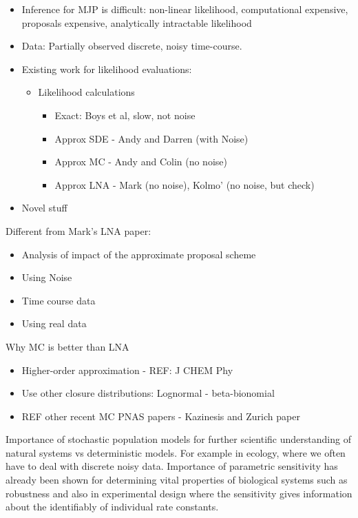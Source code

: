 \documentclass{pnastwo}
\begin{document}
\begin{article}
\begin{itemize}
\item Inference for MJP is difficult: non-linear likelihood, computational
  expensive, proposals expensive, analytically intractable likelihood
\item Data: Partially observed discrete, noisy time-course.
\item Existing work for likelihood evaluations: 
\begin{itemize}
\item Likelihood calculations
\begin{itemize}
\item Exact: Boys et al, slow, not noise
\item Approx SDE - Andy and Darren (with Noise)
\item Approx MC - Andy and Colin (no noise)
\item Approx LNA - Mark (no noise), Kolmo' (no noise, but check)
\end{itemize}
\end{itemize}
\item Novel stuff
\end{itemize}
Different from Mark's LNA paper:
\begin{itemize}
\item Analysis of impact of the approximate proposal scheme
\item Using Noise
\item Time course data
\item Using real data
\end{itemize}
Why MC is better than LNA
\begin{itemize}
\item Higher-order approximation - REF: J CHEM Phy
\item Use other closure distributions: Lognormal - beta-bionomial
\item REF other recent MC PNAS papers - Kazinesis and Zurich paper
\end{itemize}




Importance of stochastic population models for further scientific understanding
of natural systems vs deterministic models. For example in ecology, where we
often have to deal with discrete noisy data. Importance of parametric
sensitivity has already been shown for determining vital properties of
biological systems such as robustness and also in experimental design where the
sensitivity gives information about the identifiably of individual rate
constants.


\end{article}
\end{document}
